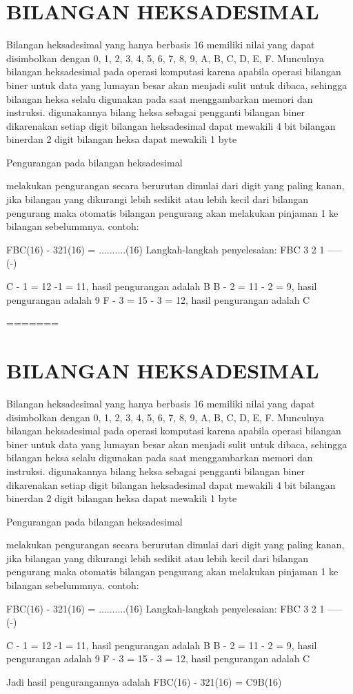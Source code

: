 \section{BILANGAN HEKSADESIMAL}

Bilangan heksadesimal yang hanya berbasis 16 memiliki nilai yang dapat disimbolkan dengan 0, 1, 2, 3, 4, 5, 6, 7, 8, 9, A, B, C, D, E, F.
Munculnya bilangan heksadesimal pada operasi komputasi karena apabila operasi bilangan biner untuk data yang lumayan besar akan menjadi 
sulit untuk dibaca, sehingga bilangan heksa selalu digunakan pada saat menggambarkan memori dan instruksi. digunakannya bilang heksa sebagai 
pengganti bilangan biner dikarenakan setiap digit bilangan heksadesimal dapat mewakili 4 bit bilangan binerdan 2 digit bilangan heksa dapat 
mewakili 1 byte 

	Pengurangan pada bilangan heksadesimal

melakukan pengurangan secara berurutan dimulai dari digit yang paling kanan, jika bilangan yang dikurangi lebih sedikit atau lebih kecil 
dari bilangan pengurang maka otomatis bilangan pengurang akan melakukan pinjaman 1 ke bilangan sebelummnya. contoh: 
	
	FBC(16) - 321(16) = ..........(16)
 Langkah-langkah penyelesaian: 
FBC 
3 2 1 ----- (-)

C - 1 = 12 -1 = 11, hasil pengurangan adalah B 
B - 2 = 11 - 2 = 9,  hasil pengurangan adalah 9
F - 3 = 15 - 3 = 12, hasil pengurangan adalah C 

=======
\section{BILANGAN HEKSADESIMAL}

Bilangan heksadesimal yang hanya berbasis 16 memiliki nilai yang dapat disimbolkan dengan 0, 1, 2, 3, 4, 5, 6, 7, 8, 9, A, B, C, D, E, F.
Munculnya bilangan heksadesimal pada operasi komputasi karena apabila operasi bilangan biner untuk data yang lumayan besar akan menjadi 
sulit untuk dibaca, sehingga bilangan heksa selalu digunakan pada saat menggambarkan memori dan instruksi. digunakannya bilang heksa sebagai 
pengganti bilangan biner dikarenakan setiap digit bilangan heksadesimal dapat mewakili 4 bit bilangan binerdan 2 digit bilangan heksa dapat 
mewakili 1 byte 

	Pengurangan pada bilangan heksadesimal

melakukan pengurangan secara berurutan dimulai dari digit yang paling kanan, jika bilangan yang dikurangi lebih sedikit atau lebih kecil 
dari bilangan pengurang maka otomatis bilangan pengurang akan melakukan pinjaman 1 ke bilangan sebelummnya. contoh: 
	
	FBC(16) - 321(16) = ..........(16)
 Langkah-langkah penyelesaian: 
FBC 
3 2 1 ----- (-)

C - 1 = 12 -1 = 11, hasil pengurangan adalah B 
B - 2 = 11 - 2 = 9,  hasil pengurangan adalah 9
F - 3 = 15 - 3 = 12, hasil pengurangan adalah C 


Jadi hasil pengurangannya adalah  FBC(16) - 321(16) = C9B(16) 